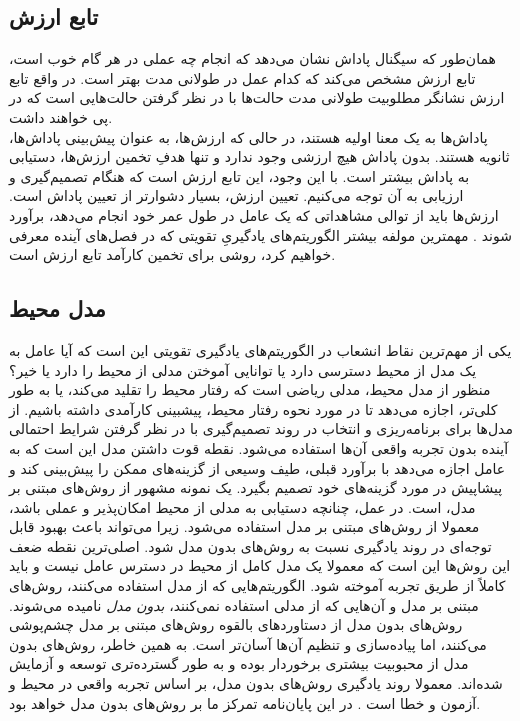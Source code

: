 \subsection{تابع ارزش}
همان‌طور که سیگنال پاداش نشان می‌دهد که انجام چه عملی در هر گام خوب است، تابع ارزش مشخص می‌کند که کدام عمل در طولانی مدت بهتر است. در واقع تابع ارزش نشانگر مطلوبیت طولانی مدت حالت‌ها با در نظر گرفتن حالت‌هایی است که در پی خواهند داشت.
\\پاداش‌ها به یک معنا اولیه هستند، در حالی که ارزش‌ها، به عنوان پیش‌بینی پاداش‌ها، ثانویه هستند. بدون پاداش هیچ ارزشی وجود ندارد و تنها هدفِ تخمین ارزش‌ها، دستیابی به پاداش بیشتر است. با این وجود، این تابع ارزش است که هنگام تصمیم‌گیری و ارزیابی به آن توجه می‌کنیم.
تعیین ارزش،‌ بسیار دشوارتر از تعیین پاداش است.
ارزش‌ها باید از توالی مشاهداتی که یک عامل در طول عمر خود انجام می‌دهد، برآورد شوند
\cite{suttonbook}.
مهمترین مولفه بیشتر الگوریتم‌های یادگیریِ تقویتی که در  فصل‌های آینده معرفی خواهیم کرد، روشی برای تخمین کارآمد تابع ارزش است.
\subsection{مدل محیط}
یکی از مهم‌ترین نقاط انشعاب در الگوریتم‌‌های یادگیری تقویتی این است که آیا عامل به یک مدل از محیط دسترسی دارد یا  توانایی آموختن مدلی از محیط را دارد یا خیر؟ منظور از مدل محیط، مدلی ریاضی است که رفتار محیط را تقلید می‌کند، یا به طور کلی‌تر، اجازه می‌دهد تا در مورد نحوه رفتار محیط، پیشبینی کارآمدی داشته ‌باشیم. از مدل‌ها برای برنامه‌ریزی و انتخاب در روند تصمیم‌گیری  با در نظر گرفتن شرایط احتمالی آینده بدون تجربه واقعی آن‌ها استفاده می‌شود.
نقطه قوت داشتن مدل این است که به عامل اجازه می‌دهد با برآورد قبلی، طیف وسیعی از گزینه‌های ممکن را پیش‌بینی کند و پیشاپیش در مورد گزینه‌های خود تصمیم بگیرد. یک نمونه مشهور از روش‌های مبتنی بر مدل، 
 است. در عمل، چنانچه دستیابی به مدلی از محیط امکان‌پذیر و عملی باشد، معمولا از روش‌های مبتنی بر مدل استفاده می‌شود. زیرا می‌تواند باعث بهبود قابل توجه‌ای در روند یادگیری نسبت به روش‌های بدون مدل شود. اصلی‌ترین نقطه ضعف این روش‌ها این است که معمولا یک مدل کامل از محیط  در دسترس عامل نیست و باید کاملاً از طریق تجربه آموخته ‌شود. الگوریتم‌هایی که از مدل استفاده می‌کنند، روش‌های مبتنی بر مدل و آن‌هایی که از مدلی استفاده نمی‌کنند، \textit{بدون مدل} نامیده می‌شوند. روش‌های بدون مدل از دستاوردهای بالقوه روش‌های مبتنی بر مدل چشم‌پوشی می‌کنند‌، اما پیاده‌سازی و تنظیم آن‌ها آسان‌تر است. به همین خاطر، روش‌های بدون مدل از محبوبیت بیشتری برخوردار بوده و به طور گسترده‌تری توسعه و آزمایش شده‌اند.  معمولا روند یادگیری روش‌های بدون مدل، بر اساس تجربه واقعی در محیط و آزمون و خطا است \cite{suttonbook}. در این پایان‌نامه تمرکز ما بر روش‌های بدون مدل خواهد بود.



